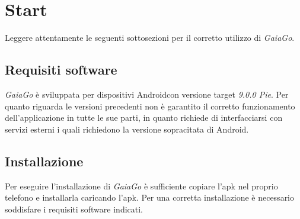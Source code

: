 \section{Start}
Leggere attentamente le seguenti sottosezioni per il corretto utilizzo di \textit{GaiaGo}.
\subsection{Requisiti software}
\textit{GaiaGo} è sviluppata per dispositivi Android\glosp con versione target \textit{9.0.0 Pie}. Per quanto riguarda le versioni precedenti non è garantito il corretto funzionamento dell'applicazione in tutte le sue parti, in quanto richiede di interfacciarsi con servizi esterni i quali richiedono la versione sopracitata di Android. 

\subsection{Installazione}
 Per eseguire l'installazione di \textit{GaiaGo} è sufficiente copiare l'apk nel proprio telefono e installarla caricando l'apk.
 Per una corretta installazione è necessario soddisfare i requisiti software indicati.
